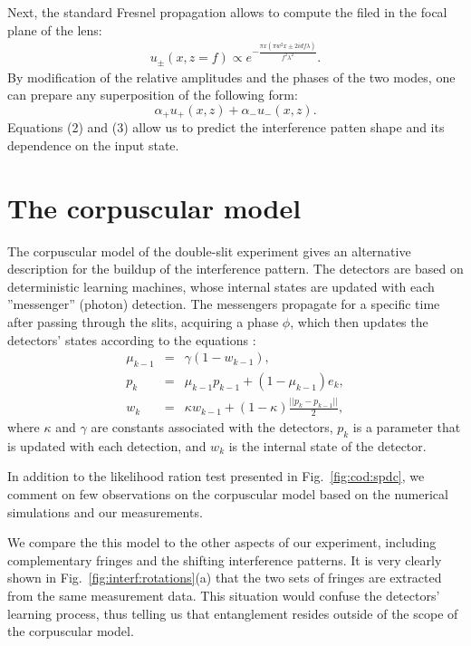 \documentclass[prl,reprint,twocolumn,amsmath,preprintnumbers,amssymb,superscriptaddress]{revtex4-1}
\newcommand{\figref}[1]{Fig.~\ref{#1}}
\begin{document}
Next, the standard Fresnel propagation allows to compute the filed in the focal plane of the lens:
\begin{eqnarray}
 		u_\pm(x,z=f) \propto e^{-\frac{\pi  x \left(\pi  w^2 x\pm 2 i d f \lambda \right)}{f^2 \lambda ^2}}.
\end{eqnarray}
By modification of the relative amplitudes and the phases of the two modes, one can prepare any superposition of the following form:
\begin{equation}
\alpha_+ u_+(x,z) + \alpha_- u_-(x,z).
\label{eq:qubit}
\end{equation}
Equations (2) and (3) allow us to predict the interference patten shape and its dependence on the input state. 

\section{The corpuscular model}

The corpuscular model of the double-slit experiment \cite{Jin2010a} gives an alternative description for the buildup of the interference pattern. The detectors are based on deterministic learning machines, whose internal states are updated with each ''messenger'' (photon) detection. The messengers propagate for a specific time after passing through the slits, acquiring a phase $\phi$, which then updates the detectors' states according to the equations \cite{Jin2010a}:
\begin{eqnarray}
\mu_{k-1}&=&\gamma(1-w_{k-1}),\\
p_k&=&\mu_{k-1}p_{k-1}+(1-\mu_{k-1})e_k,\\
w_k&=&\kappa w_{k-1}+(1-\kappa)\frac{||p_k-p_{k-1}||}{2},
\end{eqnarray}
where $\kappa$ and $\gamma$ are constants associated with the detectors, $p_k$ is a parameter that is updated with each detection, and $w_k$ is the internal state of the detector.

In addition to the likelihood ration test presented in \figref{fig:cod:spdc}, we comment on few observations on the corpuscular model based on the numerical simulations and our measurements. 

We compare the this model to the other aspects of our experiment, including complementary fringes and the shifting interference patterns. It is very clearly shown in \figref{fig:interf:rotations}(a) that the two sets of fringes are extracted from the same measurement data. This situation would confuse the detectors' learning process, thus telling us that entanglement resides outside of the scope of the corpuscular model.
\end{document}
